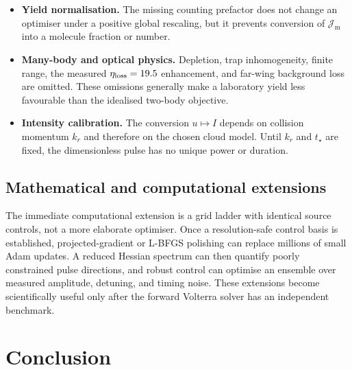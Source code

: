 \documentclass[9pt,a4paper,twocolumn,twoside]{rho-class/rho}
\newcommand{\Jmol}{\mathcal{J}_{\mathrm{m}}}
\begin{document}
\begin{itemize}
            themselves establish convergence to a global optimum.
            \item \textbf{Yield normalisation.} The missing counting prefactor
            does not change an optimiser under a positive global rescaling, but
            it prevents conversion of $\Jmol$ into a molecule fraction or
            number.
            \item \textbf{Many-body and optical physics.} Depletion, trap
            inhomogeneity, finite range, the measured
            $\eta_{\rm loss}=19.5$ enhancement, and far-wing background loss
            are omitted. These omissions generally make a laboratory yield less
            favourable than the idealised two-body objective.
            \item \textbf{Intensity calibration.} The conversion
            $u\mapsto I$ depends on collision momentum $k_r$ and therefore on
            the chosen cloud model. Until $k_r$ and $t_\star$ are fixed, the
            dimensionless pulse has no unique power or duration.
        \end{itemize}

    \subsection{Mathematical and computational extensions}

        The immediate computational extension is a grid ladder with identical
        source controls, not a more elaborate optimiser. Once a resolution-safe
        control basis is established, projected-gradient or L-BFGS polishing can
        replace millions of small Adam updates. A reduced Hessian spectrum can
        then quantify poorly constrained pulse directions, and robust control
        can optimise an ensemble over measured amplitude, detuning, and timing
        noise. These extensions become scientifically useful only after the
        forward Volterra solver has an independent benchmark.

\section{Conclusion}\label{sec:conclusion}
\end{document}
